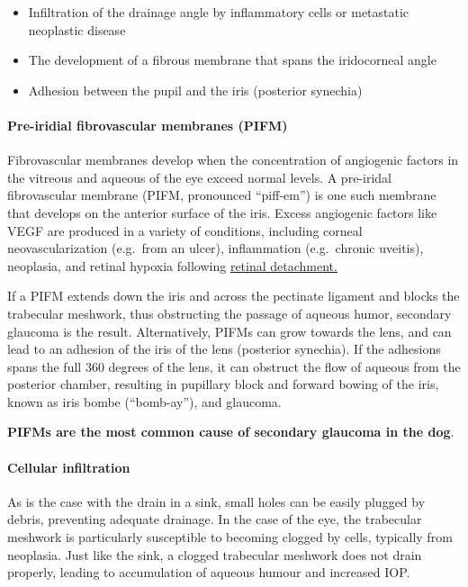 \documentclass[
  openany]{article}
\providecommand{\tightlist}{%
  \setlength{\itemsep}{0pt}\setlength{\parskip}{0pt}}
\begin{document}
\begin{itemize}
\tightlist
\item
  Infiltration of the drainage angle by inflammatory cells or metastatic neoplastic disease
\item
  The development of a fibrous membrane that spans the iridocorneal angle
\item
  Adhesion between the pupil and the iris (posterior synechia)
\end{itemize}

\hypertarget{pre-iridial-fibrovascular-membranes-pifm}{%
\paragraph{Pre-iridial fibrovascular membranes (PIFM)}\label{pre-iridial-fibrovascular-membranes-pifm}}

Fibrovascular membranes develop when the concentration of angiogenic factors in the vitreous and aqueous of the eye exceed normal levels. A pre-iridal fibrovascular membrane (PIFM, pronounced ``piff-em'') is one such membrane that develops on the anterior surface of the iris. Excess angiogenic factors like VEGF are produced in a variety of conditions, including corneal neovascularization (e.g.~from an ulcer), inflammation (e.g.~chronic uveitis), neoplasia, and retinal hypoxia following \protect\hyperlink{retinal-detachment}{retinal detachment.}

If a PIFM extends down the iris and across the pectinate ligament and blocks the trabecular meshwork, thus obstructing the passage of aqueous humor, secondary glaucoma is the result. Alternatively, PIFMs can grow towards the lens, and can lead to an adhesion of the iris of the lens (posterior synechia). If the adhesions spans the full 360 degrees of the lens, it can obstruct the flow of aqueous from the posterior chamber, resulting in pupillary block and forward bowing of the iris, known as iris bombe (``bomb-ay''), and glaucoma.

\textbf{PIFMs are the most common cause of secondary glaucoma in the dog}.

\hypertarget{cellular-infiltration}{%
\paragraph{Cellular infiltration}\label{cellular-infiltration}}

As is the case with the drain in a sink, small holes can be easily plugged by debris, preventing adequate drainage. In the case of the eye, the trabecular meshwork is particularly susceptible to becoming clogged by cells, typically from neoplasia. Just like the sink, a clogged trabecular meshwork does not drain properly, leading to accumulation of aqueous humour and increased IOP.
\end{document}
